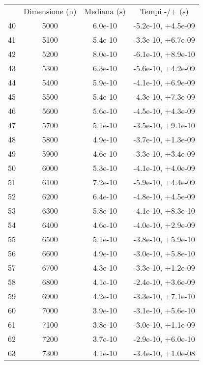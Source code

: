\begin{table}
\centering
\begin{adjustbox}{width=1\textwidth/2}
\begin{tabular}{|c|c|c|c|}
\hline
 & Dimensione (n) & Mediana (s) & Tempi -/+ (s) \\
40 & 5000 & 6.0e-10 & -5.2e-10, +4.5e-09 \\
\cline{1-4}
41 & 5100 & 5.4e-10 & -3.3e-10, +6.7e-09 \\
\cline{1-4}
42 & 5200 & 8.0e-10 & -6.1e-10, +8.9e-10 \\
\cline{1-4}
43 & 5300 & 6.3e-10 & -5.6e-10, +4.2e-09 \\
\cline{1-4}
44 & 5400 & 5.9e-10 & -4.1e-10, +6.9e-09 \\
\cline{1-4}
45 & 5500 & 5.4e-10 & -4.3e-10, +7.3e-09 \\
\cline{1-4}
46 & 5600 & 5.6e-10 & -4.5e-10, +4.3e-09 \\
\cline{1-4}
47 & 5700 & 5.1e-10 & -3.5e-10, +9.1e-10 \\
\cline{1-4}
48 & 5800 & 4.9e-10 & -3.7e-10, +1.3e-09 \\
\cline{1-4}
49 & 5900 & 4.6e-10 & -3.3e-10, +3.4e-09 \\
\cline{1-4}
50 & 6000 & 5.3e-10 & -4.1e-10, +4.0e-09 \\
\cline{1-4}
51 & 6100 & 7.2e-10 & -5.9e-10, +4.4e-09 \\
\cline{1-4}
52 & 6200 & 6.4e-10 & -4.8e-10, +4.5e-09 \\
\cline{1-4}
53 & 6300 & 5.8e-10 & -4.1e-10, +8.3e-10 \\
\cline{1-4}
54 & 6400 & 4.6e-10 & -4.0e-10, +2.9e-09 \\
\cline{1-4}
55 & 6500 & 5.1e-10 & -3.8e-10, +5.9e-10 \\
\cline{1-4}
56 & 6600 & 4.9e-10 & -3.0e-10, +5.8e-10 \\
\cline{1-4}
57 & 6700 & 4.3e-10 & -3.3e-10, +1.2e-09 \\
\cline{1-4}
58 & 6800 & 4.1e-10 & -2.4e-10, +3.6e-09 \\
\cline{1-4}
59 & 6900 & 4.2e-10 & -3.3e-10, +7.1e-10 \\
\cline{1-4}
60 & 7000 & 3.9e-10 & -3.1e-10, +5.6e-10 \\
\cline{1-4}
61 & 7100 & 3.8e-10 & -3.0e-10, +1.1e-09 \\
\cline{1-4}
62 & 7200 & 3.7e-10 & -2.9e-10, +6.0e-10 \\
\cline{1-4}
63 & 7300 & 4.1e-10 & -3.4e-10, +1.0e-08 \\

\end{tabular}
\end{adjustbox}
\end{table}
